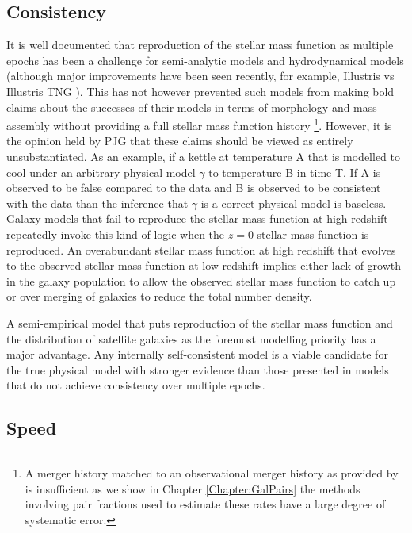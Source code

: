 \subsection{Consistency}
It is well documented that reproduction of the stellar mass function as multiple epochs has been a challenge for semi-analytic models \cite{Knebe2018CosmicModels, Asquith2018CosmicModels} and hydrodynamical models (although major improvements have been seen recently, for example, Illustris vs Illustris TNG \cite{Nelson2015TheRelease, Nelson2019TheRelease}). This has not however prevented such models from making bold claims about the successes of their models in terms of morphology and mass assembly without providing a full stellar mass function history \cite[e.g.][]{Somerville2008ANuclei, Hopkins2010MERGERSMATTER}\footnote{A merger history matched to an observational merger history as provided by \citet{Hopkins2010MERGERSMATTER} is insufficient as we show in Chapter \ref{Chapter:GalPairs} the methods involving pair fractions used to estimate these rates have a large degree of systematic error.}. However, it is the opinion held by PJG that these claims should be viewed as entirely unsubstantiated. As an example, if a kettle at temperature A that is modelled to cool under an arbitrary physical model $\gamma$ to temperature B in time T. If A is observed to be false compared to the data and B is observed to be consistent with the data than the inference that $\gamma$ is a correct physical model is baseless. Galaxy models that fail to reproduce the stellar mass function at high redshift repeatedly invoke this kind of logic when the $z=0$ stellar mass function is reproduced. An overabundant stellar mass function at high redshift that evolves to the observed stellar mass function at low redshift implies either lack of growth in the galaxy population to allow the observed stellar mass function to catch up or over merging of galaxies to reduce the total number density.

A semi-empirical model that puts reproduction of the stellar mass function and the distribution of satellite galaxies as the foremost modelling priority has a major advantage. Any internally self-consistent model is a viable candidate for the true physical model with stronger evidence than those presented in models that do not achieve consistency over multiple epochs. 

\subsection{Speed}

